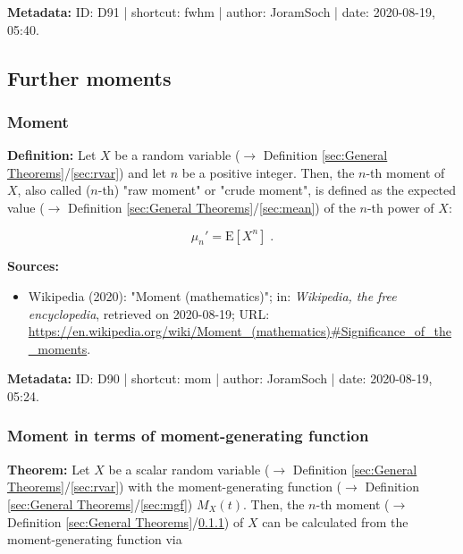 \documentclass[a4paper,12pt,twoside]{book}
\begin{document}
\vspace{1em}
\textbf{Metadata:} ID: D91 | shortcut: fwhm | author: JoramSoch | date: 2020-08-19, 05:40.
\vspace{1em}



\subsection{Further moments}

\subsubsection[\textit{Moment}]{Moment} \label{sec:mom}
\setcounter{equation}{0}

\textbf{Definition:} Let $X$ be a random variable ($\rightarrow$ Definition \ref{sec:General Theorems}/\ref{sec:rvar}) and let $n$ be a positive integer. Then, the $n$-th moment of $X$, also called ($n$-th) "raw moment" or "crude moment", is defined as the expected value ($\rightarrow$ Definition \ref{sec:General Theorems}/\ref{sec:mean}) of the $n$-th power of $X$:

\begin{equation} \label{eq:mom-mom}
\mu_n' = \mathrm{E}[X^n] \; .
\end{equation}


\vspace{1em}
\textbf{Sources:}
\begin{itemize}
\item Wikipedia (2020): "Moment (mathematics)"; in: \textit{Wikipedia, the free encyclopedia}, retrieved on 2020-08-19; URL: \url{https://en.wikipedia.org/wiki/Moment_(mathematics)#Significance_of_the_moments}.
\end{itemize}


\vspace{1em}
\textbf{Metadata:} ID: D90 | shortcut: mom | author: JoramSoch | date: 2020-08-19, 05:24.
\vspace{1em}



\subsubsection[\textbf{Moment in terms of moment-generating function}]{Moment in terms of moment-generating function} \label{sec:mom-mgf}
\setcounter{equation}{0}

\textbf{Theorem:} Let $X$ be a scalar random variable ($\rightarrow$ Definition \ref{sec:General Theorems}/\ref{sec:rvar}) with the moment-generating function ($\rightarrow$ Definition \ref{sec:General Theorems}/\ref{sec:mgf}) $M_X(t)$. Then, the $n$-th moment ($\rightarrow$ Definition \ref{sec:General Theorems}/\ref{sec:mom}) of $X$ can be calculated from the moment-generating function via
\end{document}

